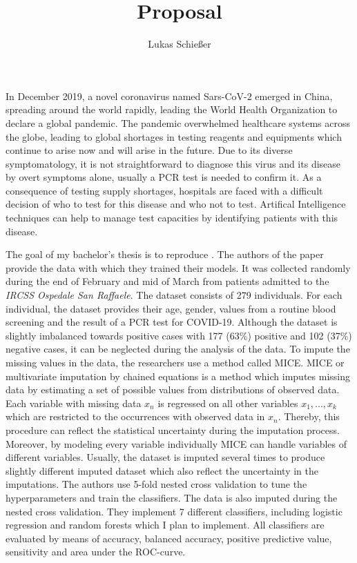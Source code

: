 \documentclass[12pt,a4paper,oneside]{article}
\title{Proposal}
\author{Lukas Schießer}
\date{}
\begin{document}
\maketitle
In December 2019, a novel coronavirus named Sars-CoV-2 emerged in China, spreading around the world rapidly, leading the World Health Organization to declare a global pandemic. The pandemic overwhelmed healthcare systems across the globe, leading to global shortages in testing reagents and equipments which continue to arise now and will arise in the future. \cite{jaecklin_2020, asm.org_2020}
Due to its diverse symptomatology, it is not straightforward to diagnose this virus and its disease by overt symptoms alone, usually a PCR test is needed to confirm it.
As a consequence of testing supply shortages, hospitals are faced with a difficult decision of who to test for this disease and who not to test.
Artifical Intelligence techniques can help to manage test capacities by identifying patients with this disease.
\par
The goal of my bachelor's thesis is to reproduce \cite{RN127}. The authors of the paper provide the data with which they trained their models. It was collected randomly during the end of February and mid of March from patients admitted to the \textit{IRCSS Ospedale San Raffaele}. The dataset consists of 279 individuals. For each individual, the dataset provides their age, gender, values from a routine blood screening and the result of a PCR test for COVID-19. Although the dataset is slightly imbalanced towards positive cases with 177 (63\%) positive and 102 (37\%) negative cases, it can be neglected during the analysis of the data. To impute the missing values in the data, the researchers use a method called MICE. MICE or multivariate imputation by chained equations is a method which imputes missing data by estimating a set of possible values from distributions of observed data. Each variable with missing data $x_n$ is regressed on all other variables $x_1, ..., x_k$ which are restricted to the occurrences with observed data in $x_n$. \cite{RN141,RN142} Thereby, this procedure can reflect the statistical uncertainty during the imputation process. Moreover, by modeling every variable individually MICE can handle variables of different variables. Usually, the dataset is imputed several times to produce slightly different imputed dataset which also reflect the uncertainty in the imputations. The authors use 5-fold nested cross validation to tune the hyperparameters and train the classifiers. The data is also imputed during the nested cross validation. They implement 7 different classifiers, including logistic regression and random forests which I plan to implement. All classifiers are evaluated by means of accuracy, balanced accuracy, positive predictive value, sensitivity and area under the ROC-curve.
\end{document}
